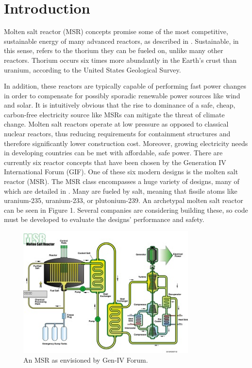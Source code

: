 \newpage

\section{Introduction}

Molten salt reactor (MSR) concepts promise some of the most competitive, 
sustainable energy of many advanced reactors, as described in 
\cite{siemer_why_2015}. Sustainable, in this sense, refers to the thorium they 
can be fueled on, unlike many other reactors. Thorium occurs six times more 
abundantly in the Earth’s crust than uranium, according to the United States 
Geological Survey.

In addition, these reactors are typically capable of performing fast power changes in order to compensate for possibly sporadic renewable power sources like wind and solar. It is intuitively obvious that the rise to dominance of a safe, cheap, carbon-free electricity source like MSRs can mitigate the threat of climate change. Molten salt reactors operate at low pressure as opposed to classical nuclear reactors, thus reducing requirements for containment structures and therefore significantly lower construction cost. Moreover, growing electricity needs in developing countries can be met with affordable, safe power. There are currently six reactor concepts that have been chosen by the Generation IV International Forum (GIF). One of these six modern designs is the molten salt reactor (MSR). The MSR class encompasses a huge variety of designs, many of which are detailed in \cite{dolan}. Many are fueled by salt, meaning that fissile atoms like uranium-235, uranium-233, or plutonium-239. An archetypal molten salt reactor can be seen in Figure 1. Several companies \cite{6comp_2015} are considering building these, so code must be developed to evaluate the designs’ performance and safety.

\begin{figure}
\includegraphics[width=0.8\textwidth]{gifmsr}
\caption{An MSR as envisioned by Gen-IV Forum.}
\label{fig:gifmsr}
\end{figure}

